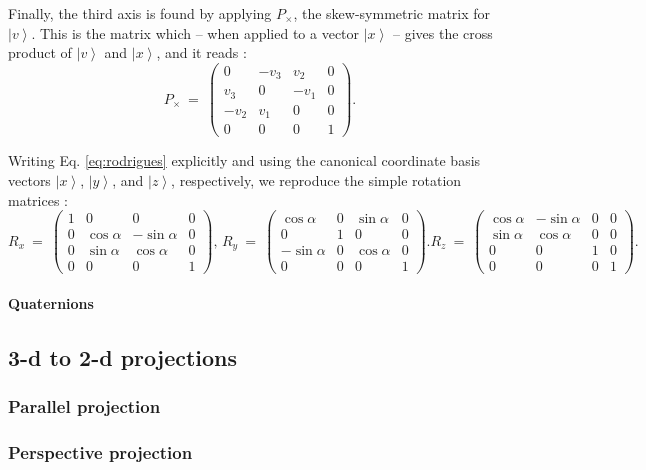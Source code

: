 Finally, the third axis is found by applying $P_{\times}$, the skew-symmetric matrix for $\left|v\right>$.
This is the matrix which -- when applied to a vector $\left|x\right>$ -- gives the cross product of $\left|v\right>$ and $\left|x\right>$, 
and it reads \cite{wiki_skewsymm}:
\begin{equation}
	P_{\times} \ =\ 
		\left( \begin{array}{cccc} 
			0       & -v_3 & v_2  & 0 \\
			v_3   & 0      & -v_1 & 0 \\
			-v_2  & v_1  & 0      & 0 \\
			0       & 0      & 0      & 1
		\end{array} \right).
\end{equation}

Writing Eq. \ref{eq:rodrigues} explicitly and using the canonical coordinate basis vectors $\left| x \right>$, $\left| y \right>$,
and $\left| z \right>$, respectively, we reproduce the simple rotation matrices \cite{TODO}:
\begin{equation}
	R_x \ =\ 
		\left( \begin{array}{cccc} 
			1 &                0 &                 0  & 0 \\
			0 & \cos \alpha & -\sin \alpha  & 0 \\
			0 & \sin \alpha  &  \cos \alpha  & 0 \\
			0 &                0 &                  0  & 1
		\end{array} \right),\,
	R_y \ =\ 
		\left( \begin{array}{cccc} 
			 \cos \alpha &         0 &   \sin \alpha &                 0 \\
			               0  &         1 &                  0 &                 0 \\
			-\sin \alpha  &         0 &  \cos \alpha &                 0 \\
			                 0 &         0 &                  0 &                1
		\end{array} \right).
	R_z \ =\ 
		\left( \begin{array}{cccc} 
			\cos \alpha & -\sin \alpha &                 0  & 0 \\
			\sin \alpha  & \cos \alpha &                 0  & 0 \\
			               0 &                 0 &                 1  & 0 \\
			               0 &                 0 &                 0  & 1
		\end{array} \right).
\end{equation}


\paragraph{Quaternions}


\subsection{3-d to 2-d projections}

\subsubsection{Parallel projection}

\subsubsection{Perspective projection}


